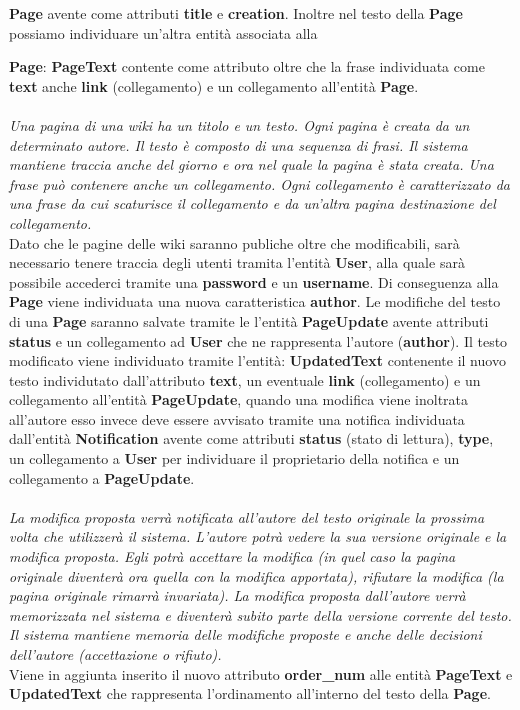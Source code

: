 \documentclass{article}
\begin{document}
	{\textbf {Page}} avente come attributi {\textbf {title}} e {\textbf {creation}}. Inoltre nel testo della {\textbf {Page}} possiamo individuare un'altra entità associata alla {\textbf {Page}: {\textbf {PageText}} contente come attributo oltre che la frase individuata come {\textbf {text}} anche {\textbf {link}} (collegamento) e un collegamento all'entità \textbf{Page}.\\ \\
		{\itshape Una pagina di una wiki ha un titolo e un testo. Ogni pagina è creata da un determinato autore. Il testo è
			composto di una sequenza di frasi. Il sistema mantiene traccia anche del giorno e ora nel quale la pagina è
			stata creata. Una frase può contenere anche un collegamento. Ogni collegamento è caratterizzato da una
			frase da cui scaturisce il collegamento e da un’altra pagina destinazione del collegamento.}
		\vspace{0.5cm}
		\\
		Dato che le pagine delle wiki saranno publiche oltre che modificabili, sarà necessario tenere traccia degli utenti tramita l'entità {\textbf {User}}, alla quale sarà possibile accederci tramite una {\textbf {password}} e un {\textbf {username}}. Di conseguenza alla {\textbf {Page} viene individuata una nuova caratteristica {\textbf {author}}. Le modifiche del testo di una {\textbf {Page}} saranno salvate tramite le l'entità {\textbf {PageUpdate}} avente attributi {\textbf {status}} e un collegamento ad \textbf{User} che ne rappresenta l'autore ({\textbf {author}}}). Il testo modificato viene individuato tramite l'entità: {\textbf {UpdatedText}} contenente il nuovo testo individutato dall'attributo \textbf{text}, un eventuale \textbf{link} (collegamento) e un collegamento all'entità \textbf{PageUpdate}, quando una modifica viene inoltrata all'autore esso invece deve essere avvisato tramite una notifica individuata dall'entità {\textbf {Notification}} avente come attributi {\textbf {status}} (stato di lettura), {\textbf {type}}, un collegamento a {\textbf{User}} per individuare il proprietario della notifica e un collegamento a \textbf{PageUpdate}. \\ \\
		{\itshape La modifica proposta verrà notificata all’autore del testo originale la prossima volta che utilizzerà il sistema.
			L’autore potrà vedere la sua versione originale e la modifica proposta. Egli potrà accettare la modifica (in
			quel caso la pagina originale diventerà ora quella con la modifica apportata), rifiutare la modifica (la pagina
			originale rimarrà invariata). La modifica proposta dall’autore verrà memorizzata nel sistema e diventerà
			subito parte della versione corrente del testo. Il sistema mantiene memoria delle modifiche proposte e anche
			delle decisioni dell’autore (accettazione o rifiuto).}
		\vspace{0.5cm}
		\\
		Viene in aggiunta inserito il nuovo attributo \textbf{order\_num} alle entità {\textbf {PageText}} e {\textbf {UpdatedText}} che rappresenta l'ordinamento all'interno del testo della {\textbf {Page}}.
		
}
\end{document}
